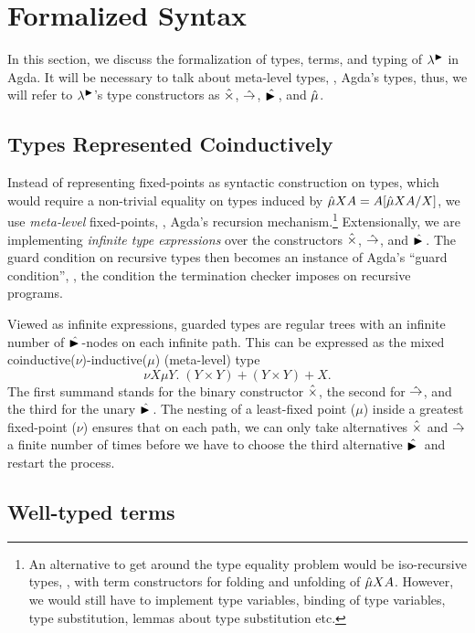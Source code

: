 
\section{Formalized Syntax}
\label{sec:syntax}

In this section, we discuss the formalization of types, terms, and
typing of $\lambda^{\mathord{\blacktriangleright}}$ in Agda.  It will be necessary to talk about
meta-level types, \ie, Agda's types, thus, we will refer to
$\lambda^{\mathord{\blacktriangleright}}$'s type constructors as $\hattimes$, $\hatto$,
$\hatlater$, and $\hatmu$.

\subsection{Types Represented Coinductively}

Instead of representing fixed-points as syntactic construction on
types, which would require a non-trivial equality on types induced by
$\hatmu X A = \subst{\hatmu X A}X A$, we use \emph{meta-level} fixed-points,
\ie, Agda's recursion mechanism.\footnote{
An alternative to get around the type equality problem would be
iso-recursive types, \ie, with term constructors for folding and
unfolding of $\hatmu X A$.  However, we would still have to implement
type variables, binding of type variables, type substitution, lemmas
about type substitution etc.
}
Extensionally, we are implementing
\emph{infinite type expressions} over the constructors $\hattimes$,
$\hatto$, and $\hatlater$.  The guard condition on recursive types then
becomes an instance of Agda's ``guard condition'', \ie, the condition
the termination checker imposes on recursive programs.

Viewed as infinite expressions, guarded types are regular trees with
an infinite number of $\hatlater$-nodes on each infinite path.  This
can be expressed as the mixed coinductive($\nu$)-inductive($\mu$) (meta-level) type
\[
  \nu X \mu Y.\; (Y \times Y) + (Y \times Y) + X.
\]
The first summand stands for the binary constructor $\hattimes$, the
second for $\hatto$, and the third for the unary $\hatlater$.  The
nesting of a least-fixed point ($\mu$) inside a greatest fixed-point
($\nu$) ensures that on each path, we can only take alternatives
$\hattimes$ and $\hatto$ a finite number of times before we have to
choose the third alternative $\hatlater$ and restart the process.




\subsection{Well-typed terms}

